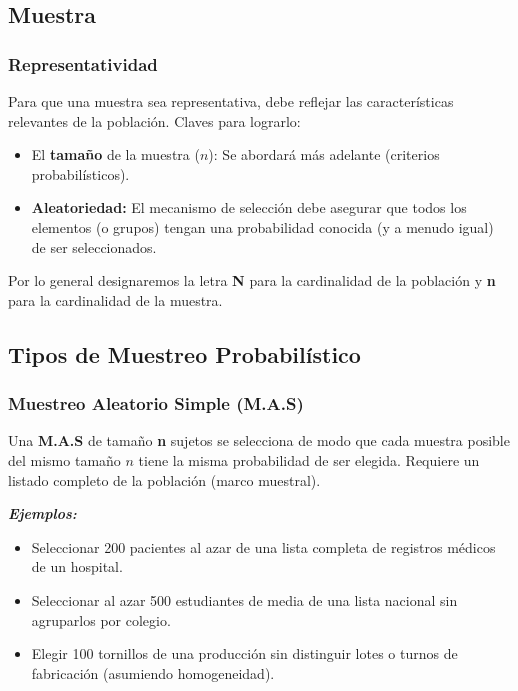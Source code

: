 \documentclass[12pt, letterpaper]{article}
\begin{document}
\subsection{Muestra}
\subsubsection{Representatividad}
Para que una muestra sea representativa, debe reflejar las características relevantes de la población. Claves para lograrlo:
\begin{itemize}
    \item El \textbf{tamaño} de la muestra ($n$): Se abordará más adelante (criterios probabilísticos). %
    \item \textbf{Aleatoriedad:} El mecanismo de selección debe asegurar que todos los elementos (o grupos) tengan una probabilidad conocida (y a menudo igual) de ser seleccionados. %
\end{itemize}
Por lo general designaremos la letra \textbf{N} para la cardinalidad de la población y \textbf{n} para la cardinalidad de la muestra. %

\subsection{Tipos de Muestreo Probabilístico} %
\subsubsection{Muestreo Aleatorio Simple (M.A.S)}
Una \textbf{M.A.S} de tamaño \textbf{n} sujetos se selecciona de modo que cada muestra posible del mismo tamaño $n$ tiene la misma probabilidad de ser elegida. Requiere un listado completo de la población (marco muestral).

\textbf{\textit{Ejemplos:}}
\begin{itemize}
    \item Seleccionar 200 pacientes al azar de una lista completa de registros médicos de un hospital.
    \item Seleccionar al azar 500 estudiantes de media de una lista nacional sin agruparlos por colegio.
    \item Elegir 100 tornillos de una producción sin distinguir lotes o turnos de fabricación (asumiendo homogeneidad).
\end{itemize}
\end{document}
